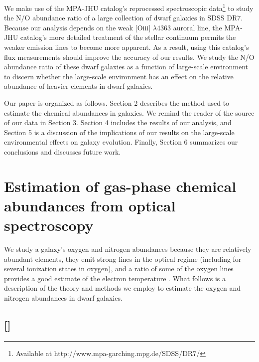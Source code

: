 We make use of the MPA-JHU catalog's reprocessed spectroscopic 
data\footnote{Available at http://www.mpa-garching.mpg.de/SDSS/DR7/} to study 
the N/O abundance ratio of a large collection of dwarf galaxies in SDSS DR7.  
Because our analysis depends on the weak [O{\sc iii}] $\lambda 4363$ auroral 
line, the MPA-JHU catalog's more detailed treatment of the stellar continuum 
permits the weaker emission lines to become more apparent.  As a result, using 
this catalog's flux measurements should improve the accuracy of our results.  We 
study the N/O abundance ratio of these dwarf galaxies as a function of 
large-scale environment to discern whether the large-scale environment has an 
effect on the relative abundance of heavier elements in dwarf galaxies.

Our paper is organized as follows.  Section 2 describes the method used to 
estimate the chemical abundances in galaxies.  We remind the reader of the 
source of our data in Section 3.  Section 4 includes the results of our analysis, 
and Section 5 is a discussion of the implications of our results on the 
large-scale environmental effects on galaxy evolution.  Finally, Section 6 
summarizes our conclusions and discusses future work.


%
%
\section[Theory]{Estimation of gas-phase chemical abundances from optical spectroscopy}
\label{sec:Theory}

We study a galaxy's oxygen and nitrogen abundances because they are relatively 
abundant elements, they emit strong lines in the optical regime (including for 
several ionization states in oxygen), and a ratio of some of the oxygen lines 
provides a good estimate of the electron temperature \citep{Kewley02}.  What 
follows is a description of the theory and methods we employ to estimate the 
oxygen and nitrogen abundances in dwarf galaxies.


\subsection{[]}

